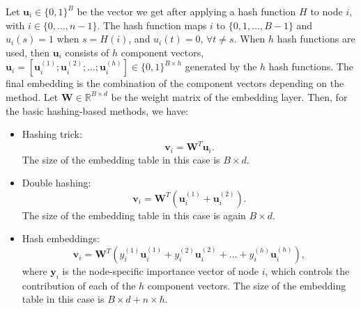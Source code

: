 \documentclass[conference]{IEEEtran}
\begin{document}
Let $\mathbf{u}_i \in \{0,1\}^{B}$ be the vector we get after applying a hash function $H$ to node $i$, with $i \in \{0, \dots, n-1\}$. The hash function maps $i$ to $\{0,1,\dots,B-1\}$ and $u_i (s)=1$ when $s = H(i)$, and $u_i (t)=0$, $\forall t \neq s$. 
%
When $h$ hash functions are used, then $\mathbf{u}_i$ consists of $h$ component vectors, $\mathbf{u}_i = [\mathbf{u}_i^{(1)}; \mathbf{u}_i^{(2)}; \dots; \mathbf{u}_i^{(h)}] \in \{0,1\}^{B \times h}$ generated by the $h$ hash functions. The final embedding is the combination of the component vectors depending on the method.
%
Let $\mathbf{W} \in \mathbb{R}^{B\times d}$ be the weight matrix of the embedding layer. Then, for the basic hashing-based methods, we have:
\begin{itemize}
    \item Hashing trick:
    \begin{equation}
         \mathbf{v}_i = \mathbf{W}^T \mathbf{u}_i.
    \end{equation}
    The size of the embedding table in this case is $B \times d$.
    \item Double hashing: 
    \begin{equation}
        \mathbf{v}_i = \mathbf{W}^T(\mathbf{u}^{(1)}_i+\mathbf{u}_i^{(2)}).
    \end{equation}
    The size of the embedding table in this case is again $B\times d$.
    \item Hash embeddings: 
    \begin{equation}
    \label{eq:hashembeddings}
        \mathbf{v}_i = \mathbf{W}^T(y^{(1)}_i \mathbf{u}_i^{(1)} + y^{(2)}_i \mathbf{u}_i^{(2)}+\dots + y^{(h)}_i \mathbf{u}_i^{(h)}),
    \end{equation}
        where $\mathbf{y}_i$ is the node-specific importance vector of node $i$, which controls the contribution of each of the $h$ component vectors. The size of the embedding table in this case is $B\times d + n\times h$.
\end{itemize}


\end{document}
